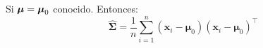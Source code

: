Si $\bf{\mu} = \bf{\mu}_0$ conocido. Entonces:
$$
\widehat{\boldsymbol{\Sigma}}=\frac{1}{n} \sum_{i=1}^{n}\left(\boldsymbol{x}_{i}-\boldsymbol{\mu}_{0}\right)\left(\boldsymbol{x}_{i}-\boldsymbol{\mu}_{0}\right)^{\top}
$$